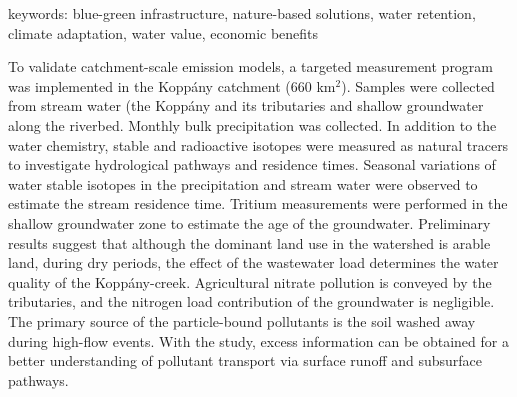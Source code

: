 keywords: blue-green infrastructure, nature-based solutions, water retention, climate adaptation, water value, economic benefits
\newpage{}
{}
\begin{flushleft}









\end{flushleft}

\noindent

To validate catchment-scale emission models, a targeted measurement program was implemented in the Koppány catchment (660 km$^2$). Samples were collected from stream water (the Koppány and its tributaries and shallow groundwater along the riverbed. Monthly bulk precipitation was collected. In addition to the water chemistry, stable and radioactive isotopes were measured as natural tracers to investigate hydrological pathways and residence times. Seasonal variations of water stable isotopes in the precipitation and stream water were observed to estimate the stream residence time. Tritium measurements were performed in the shallow groundwater zone to estimate the age of the groundwater. Preliminary results suggest that although the dominant land use in the watershed is arable land, during dry periods, the effect of the wastewater load determines the water quality of the Koppány-creek. Agricultural nitrate pollution is conveyed by the tributaries, and the nitrogen load contribution of the groundwater is negligible. The primary source of the particle-bound pollutants is the soil washed away during high-flow events. With the study, excess information can be obtained for a better understanding of pollutant transport via surface runoff and subsurface pathways.

